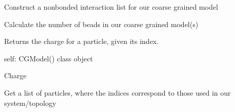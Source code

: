 \documentclass[letterpaper,12pt,english,openany,oneside]{sphinxmanual}
\begin{document}
\begin{fulllineitems}
\begin{fulllineitems}
\label{\detokenize{cg_model:cg_model.cgmodel.CGModel.get_nonbonded_interaction_list}}
Construct a nonbonded interaction list for our coarse grained model

\end{fulllineitems}


\begin{fulllineitems}
\label{\detokenize{cg_model:cg_model.cgmodel.CGModel.get_num_beads}}
Calculate the number of beads in our coarse grained model(s)

\end{fulllineitems}


\begin{fulllineitems}
\label{\detokenize{cg_model:cg_model.cgmodel.CGModel.get_particle_charge}}
Returns the charge for a particle, given its index.

self: CGModel() class object

Charge

\end{fulllineitems}


\begin{fulllineitems}
\label{\detokenize{cg_model:cg_model.cgmodel.CGModel.get_particle_list}}
Get a list of particles, where the indices correspond to those used in our system/topology

\end{fulllineitems}



\end{fulllineitems}
\end{document}
